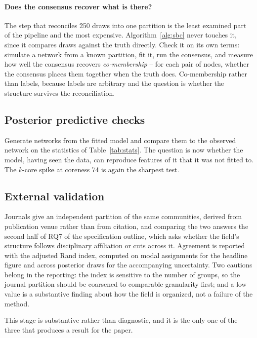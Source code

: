 \documentclass[11pt]{article}
\begin{document}
\paragraph{Does the consensus recover what is there?} The step that reconciles
250 draws into one partition is the least examined part of the pipeline and the
most expensive. Algorithm~\ref{alg:sbc} never touches it, since it compares
draws against the truth directly. Check it on its own terms: simulate a network
from a known partition, fit it, run the consensus, and measure how well the
consensus recovers \emph{co-membership} -- for each pair of nodes, whether the
consensus places them together when the truth does. Co-membership rather than
labels, because labels are arbitrary and the question is whether the structure
survives the reconciliation.

\subsection{Posterior predictive checks}

Generate networks from the fitted model and compare them to the observed network
on the statistics of Table~\ref{tab:stats}. The question is now whether the
model, having seen the data, can reproduce features of it that it was not fitted
to. The $k$-core spike at coreness 74 is again the sharpest test.

\subsection{External validation}

Journals give an independent partition of the same communities, derived from
publication venue rather than from citation, and comparing the two answers the
second half of RQ7 of the specification outline, which asks whether the field's
structure follows disciplinary affiliation or cuts across it. Agreement is reported with the adjusted Rand index, computed
on modal assignments for the headline figure and across posterior draws for the
accompanying uncertainty. Two cautions belong in the reporting: the index is
sensitive to the number of groups, so the journal partition should be coarsened
to comparable granularity first; and a low value is a substantive finding about
how the field is organized, not a failure of the method.

This stage is substantive rather than diagnostic, and it is the only one of the
three that produces a result for the paper.
\end{document}

